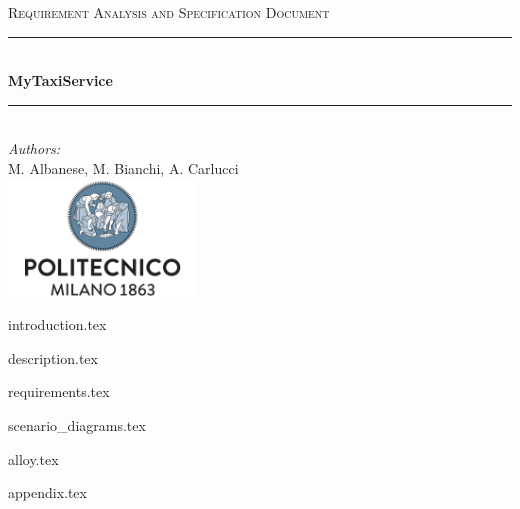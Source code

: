 \documentclass[a4paper,11pt]{article}
\begin{document}
\begin{titlepage}
\begin{center}
\textsc{\LARGE Requirement Analysis and Specification Document}\\[1.5cm] %

\rule{\linewidth}{0.5mm} \\[0.7cm]
{\huge \bfseries MyTaxiService}\\[0.4cm] %
\rule{\linewidth}{0.5mm} \\[1.5cm]
 
\emph{Authors:}\\
M. Albanese, M. Bianchi, A. Carlucci\\[2.0cm] 

\vfill
\vfill
\includegraphics[width=50mm]{polimi.png}\\
\end{center}
\end{titlepage}

\tableofcontents
\pagebreak

{introduction.tex}

{description.tex}

{requirements.tex}

{scenario_diagrams.tex}

{alloy.tex}

{appendix.tex}

\end{document}
